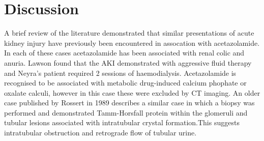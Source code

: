 \documentclass[11pt, ]{article}
\begin{document}
\section*{Discussion}
A brief review of the literature demonstrated that similar presentations of acute kidney injury have previously been encountered in assocation with acetazolamide\cite{Neyra2014, Rossert1984, Lawson2020}. In each of these cases acetazolamide has been associated with renal colic and anuria. Lawson found that the AKI demonstrated with aggressive fluid therapy and Neyra's patient required 2 sessions of haemodialysis. Acetazolamide is recognised to be associated with metabolic drug-induced calcium phophate or oxalate calculi, however in this case these were excluded by CT imaging. An older case published by Rossert in 1989 describes a similar case in which a biopsy was performed and demonstrated Tamm-Horsfall protein within the glomeruli and tubular lesions associated with intratubular crystal formation.This suggests intratubular obstruction and retrograde flow of tubular urine\cite{Rossert1984}.  




\printbibliography
\end{document}

